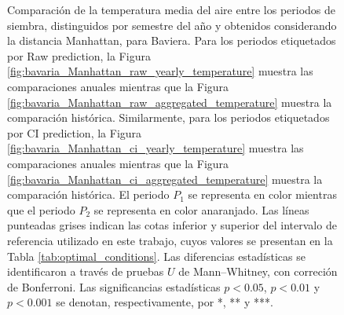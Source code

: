 \begin{figure}[htbp]
	\caption{
		Comparación de la temperatura media del aire entre los periodos de siembra, distinguidos por semestre del año y obtenidos considerando la distancia Manhattan, para Baviera. Para los periodos etiquetados por Raw prediction, la Figura \ref{fig:bavaria_Manhattan_raw_yearly_temperature} muestra las comparaciones anuales mientras que la Figura \ref{fig:bavaria_Manhattan_raw_aggregated_temperature} muestra la comparación histórica. Similarmente, para los periodos etiquetados por CI prediction, la Figura \ref{fig:bavaria_Manhattan_ci_yearly_temperature} muestra las comparaciones anuales mientras que la Figura \ref{fig:bavaria_Manhattan_ci_aggregated_temperature} muestra la comparación histórica. El periodo $P_1$ se representa en color mientras que el periodo $P_2$ se representa en color anaranjado. Las líneas punteadas grises indican las cotas inferior y superior del intervalo de referencia utilizado en este trabajo, cuyos valores se presentan en la Tabla \ref{tab:optimal_conditions}. Las diferencias estadísticas se identificaron a través de pruebas $U$ de Mann--Whitney, con correción de Bonferroni. Las significancias estadísticas $p<0.05$, $p<0.01$ y $p<0.001$ se denotan, respectivamente, por *, ** y ***.
	}
	\label{fig:bavaria_Manhattan_average_temperature}
	
	
\end{figure}




